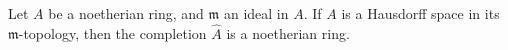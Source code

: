 Let $A$ be a noetherian ring, and $\mathfrak{m}$ an ideal in $A$. If $A$ is a Hausdorff space in its $\mathfrak{m}$-topology, then the completion $\hat{A}$ is a noetherian ring.
